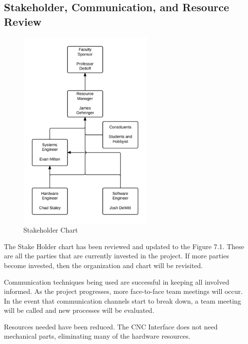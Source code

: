\subsection{Stakeholder, Communication, and Resource Review}
\begin{figure}[p]
\centering
\includegraphics[width=0.6\textwidth]{shc.jpeg}
\caption{Stakeholder Chart}
\label{fig:Stakeholder Chart}
\end{figure}
The Stake Holder chart has been reviewed and updated to the Figure 7.1.
These are all the parties that are currently invested in the project. 
If more parties become invested, then the organization and chart will be revisited. 

Communication techniques being used are successful in keeping all involved informed.
As the project progresses, more face-to-face team meetings will occur.
In the event that communication channels start to break down, a team meeting will be called and new processes will be evaluated. 

Resources needed have been reduced. 
The CNC Interface does not need mechanical parts, eliminating many of the hardware resources.

